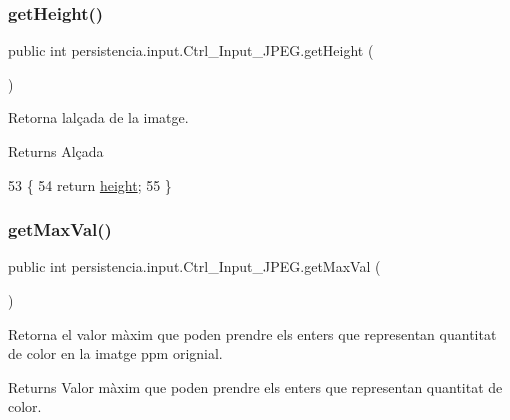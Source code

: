 \subsubsection{\texorpdfstring{get\+Height()}{getHeight()}}
{\footnotesize\ttfamily public int persistencia.\+input.\+Ctrl\+\_\+\+Input\+\_\+\+J\+P\+E\+G.\+get\+Height (\begin{DoxyParamCaption}{ }\end{DoxyParamCaption})\hspace{0.3cm}{\ttfamily [inline]}}



Retorna l\textquotesingle{}alçada de la imatge. 

\begin{DoxyReturn}{Returns}
Alçada 
\end{DoxyReturn}

\begin{DoxyCode}
53                            \{
54         \textcolor{keywordflow}{return} \hyperlink{classpersistencia_1_1input_1_1Ctrl__Input__JPEG_a9e6805b998e58981f8cd7b8b6e609f27}{height};
55     \}
\end{DoxyCode}
\mbox{\label{classpersistencia_1_1input_1_1Ctrl__Input__JPEG_a7c07d70b1dd3881e3322e9e3403e2ae7}} 
\subsubsection{\texorpdfstring{get\+Max\+Val()}{getMaxVal()}}
{\footnotesize\ttfamily public int persistencia.\+input.\+Ctrl\+\_\+\+Input\+\_\+\+J\+P\+E\+G.\+get\+Max\+Val (\begin{DoxyParamCaption}{ }\end{DoxyParamCaption})\hspace{0.3cm}{\ttfamily [inline]}}



Retorna el valor màxim que poden prendre els enters que representan quantitat de color en la imatge ppm orignial. 

\begin{DoxyReturn}{Returns}
Valor màxim que poden prendre els enters que representan quantitat de color. 
\end{DoxyReturn}


